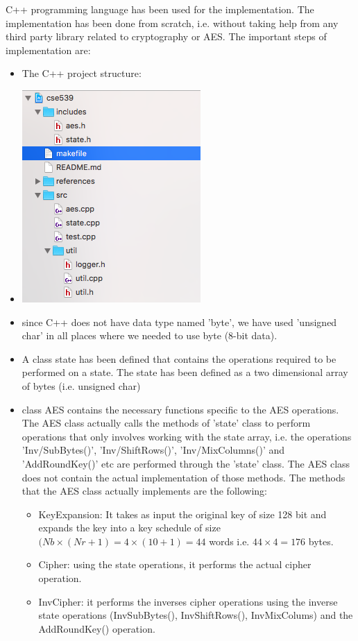 \documentclass[twoside]{article}
\begin{document}
C++ programming language has been used for the implementation. The implementation has been done from scratch, i.e. without taking help from any third party library related to cryptography or AES. The important steps of implementation are:
\begin{itemize}
	\item The C++ project structure:
	\item \includegraphics{project_structure_xcode}
	\item since C++ does not have data type named 'byte', we have used 'unsigned char' in all places where we needed to use byte (8-bit data).
	\item A class state has been defined that contains the operations required to be performed on a state. The state has been defined as a two dimensional array of bytes (i.e. unsigned char)
	\item class AES contains the necessary functions specific to the AES operations. The AES class actually calls the methods of 'state' class to perform operations that only involves working with the state array, i.e. the operations 'Inv/SubBytes()', 'Inv/ShiftRows()', 'Inv/MixColumns()' and 'AddRoundKey()' etc are performed through the 'state' class. The AES class does not contain the actual implementation of those methods. The methods that the AES class actually implements are the following:
	\begin{itemize}
		\item KeyExpansion: It takes as input the original key of size 128 bit and expands the key into a key schedule of size $(Nb \times (Nr+1) = 4\times (10+1)=44$ words i.e. $44\times 4 = 176$ bytes.
		\item Cipher: using the state operations, it performs the actual cipher operation.
		\item InvCipher: it performs the inverses cipher operations using the inverse state operations (InvSubBytes(), InvShiftRows(), InvMixColums) and the AddRoundKey() operation.

\end{itemize}
\end{itemize}
\end{document}

